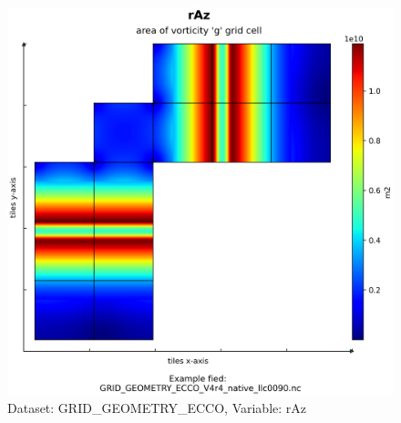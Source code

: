 \begin{figure}[H]
\centering
\includegraphics[scale=0.55]{../images/plots/native_plots_coords/Geometry_Parameters_for_the_Lat-Lon-Cap_90_(llc90)_Native_Model_Grid_(Version_4_Release_4)/rAz.png}
\caption{Dataset: GRID\_GEOMETRY\_ECCO, Variable: rAz}
\label{tab:table-GRID_GEOMETRY_ECCO_rAz-Plot}
\end{figure}
\pagebreak
